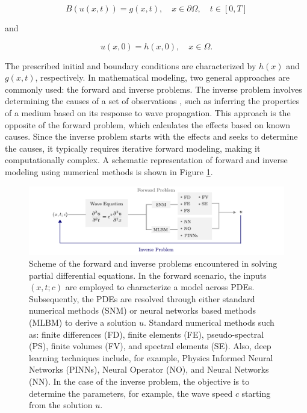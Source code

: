\documentclass[11pt,twoside]{article}
\begin{document}
\begin{equation*}
B (u(x, t)) = g(x, t), \quad x \in \partial \Omega, \quad t \in [0, T] 
\end{equation*}

and

\begin{equation*}
u(x, 0) = h(x, 0), \quad x \in \Omega .
\end{equation*}

The prescribed initial and boundary conditions are characterized by $h(x)$ and $g(x,t)$, respectively. In mathematical 
modeling, two general approaches are commonly used: the forward and inverse problems. The inverse problem involves 
determining the causes of a set of observations \citep{roth_neural_1994,Tarantola}, such as inferring the properties 
of a medium based on its response to wave propagation. This approach is the opposite of the forward problem, which 
calculates the effects based on known causes. Since the inverse problem starts with the effects and seeks to determine 
the causes, it typically requires iterative forward modeling, making it computationally complex. A schematic representation 
of forward and inverse modeling using numerical methods is shown in Figure \ref{fig:forward_inverse}.

\begin{figure}[h]
\includegraphics{figs/forward_inverse_modeling_waves.pdf}
    \caption{Scheme of the forward and inverse problems encountered in solving partial differential equations. In the forward 
    scenario, the inputs $(x,t;c)$ are employed to characterize a model across PDEs. Subsequently, the PDEs are resolved through 
    either standard numerical methods (SNM) or neural networks based methods (MLBM) to derive a solution $u$. Standard numerical 
    methods such as: finite differences (FD), finite elements (FE), pseudo-spectral (PS), finite volumes (FV), and spectral 
    elements (SE). Also, deep learning techniques include, for example, Physics Informed Neural Networks (PINNs), Neural Operator 
    (NO), and Neural Networks (NN). In the case of the inverse problem, the objective is to determine the parameters, for example, 
    the wave speed $c$ starting from the solution $u$.}
    \label{fig:forward_inverse}
\end{figure}
\end{document}
